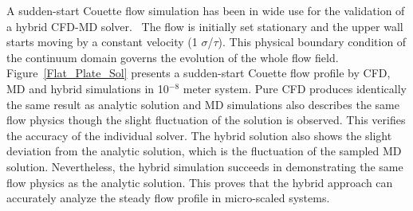 \documentclass[preprint,12pt]{elsarticle}
\begin{document}
A sudden-start Couette flow simulation has been in wide use for the validation of a hybrid CFD-MD solver.~\cite{Nie,Yen} The flow is initially set stationary and the upper wall starts moving by a constant velocity (1 $\sigma$/$\tau$). This physical boundary condition of the continuum domain governs the evolution of the whole flow field. Figure~\ref{Flat_Plate_Sol} presents a sudden-start Couette flow profile by CFD, MD and hybrid simulations in 10$^{-8}$ meter system. Pure CFD produces identically the same result as analytic solution and MD simulations also describes the same flow physics though the slight fluctuation of the solution is observed. This verifies the accuracy of the individual solver. The hybrid solution also shows the slight deviation from the analytic solution, which is the fluctuation of the sampled MD solution. Nevertheless, the hybrid simulation succeeds in demonstrating the same flow physics as the analytic solution. %
This proves that the hybrid approach can accurately analyze the steady flow profile in micro-scaled systems.
\end{document}
